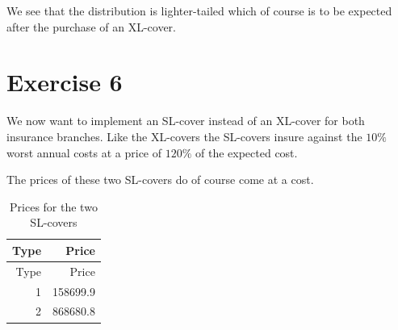\documentclass[]{article}
\begin{document}
We see that the distribution is lighter-tailed which of course is to be
expected after the purchase of an XL-cover.

\section{Exercise 6}\label{exercise-6}

We now want to implement an SL-cover instead of an XL-cover for both
insurance branches. Like the XL-covers the SL-covers insure against the
\(10\%\) worst annual costs at a price of \(120\%\) of the expected
cost.

The prices of these two SL-covers do of course come at a cost.

\begin{longtable}[]{@{}rr@{}}
\caption{Prices for the two SL-covers}\tabularnewline
\toprule
Type & Price\tabularnewline
\midrule
\endfirsthead
\toprule
Type & Price\tabularnewline
\midrule
\endhead
1 & 158699.9\tabularnewline
2 & 868680.8\tabularnewline
\bottomrule
\end{longtable}
\end{document}
